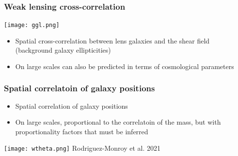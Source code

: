 \documentclass{beamer}
\begin{document}
\frame
{
    \frametitle{Weak lensing cross-correlation}


    \begin{center}
        \texttt{[image: ggl.png]}
    \end{center}

    \begin{itemize}

        \item Spatial cross-correlation between lens galaxies and
            the shear field (background galaxy ellipticities)

        \item On large scales can also be predicted in terms of cosmological
            parameters

    \end{itemize}

}

\frame
{
    \frametitle{Spatial correlatoin of galaxy positions}


    \begin{itemize}

        \item Spatial correlation of galaxy positions 

        \item On large scales, proportional to the correlatoin of the
            mass, but with proportionality factors that must be inferred

    \end{itemize}
    \begin{center}
        \texttt{[image: wtheta.png]}
        {\tiny Rodriguez-Monroy et al. 2021}
    \end{center}

}
\end{document}
